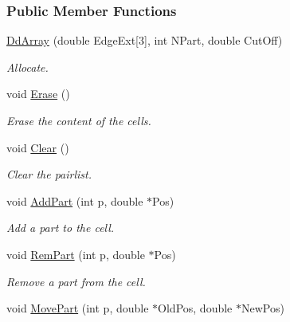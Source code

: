 \subsubsection*{\-Public \-Member \-Functions}
\begin{DoxyCompactItemize}
\item 
\hyperlink{classDdArray_a427b9066964de29a0ecd3d5fe2bedb56}{\-Dd\-Array} (double \-Edge\-Ext\mbox{[}3\mbox{]}, int \-N\-Part, double \-Cut\-Off)
\begin{DoxyCompactList}\small\item\em \-Allocate. \end{DoxyCompactList}\item 
void \hyperlink{classDdArray_a98ae2e78109ea826eea71da14c37ce95}{\-Erase} ()
\begin{DoxyCompactList}\small\item\em \-Erase the content of the cells. \end{DoxyCompactList}\item 
\hypertarget{classDdArray_aa71d36872f416feaa853788a7a7a7ef8}{void \hyperlink{classDdArray_aa71d36872f416feaa853788a7a7a7ef8}{\-Clear} ()}\label{classDdArray_aa71d36872f416feaa853788a7a7a7ef8}

\begin{DoxyCompactList}\small\item\em \-Clear the pairlist. \end{DoxyCompactList}\item 
\hypertarget{classDdArray_a16bd930c99f12ce47277234de23650ca}{void \hyperlink{classDdArray_a16bd930c99f12ce47277234de23650ca}{\-Add\-Part} (int p, double $\ast$\-Pos)}\label{classDdArray_a16bd930c99f12ce47277234de23650ca}

\begin{DoxyCompactList}\small\item\em \-Add a part to the cell. \end{DoxyCompactList}\item 
\hypertarget{classDdArray_aa81dd095eb9134882b33685338bec68c}{void \hyperlink{classDdArray_aa81dd095eb9134882b33685338bec68c}{\-Rem\-Part} (int p, double $\ast$\-Pos)}\label{classDdArray_aa81dd095eb9134882b33685338bec68c}

\begin{DoxyCompactList}\small\item\em \-Remove a part from the cell. \end{DoxyCompactList}\item 
\hypertarget{classDdArray_a02a69943ed15121906bda20d9c89cb37}{void \hyperlink{classDdArray_a02a69943ed15121906bda20d9c89cb37}{\-Move\-Part} (int p, double $\ast$\-Old\-Pos, double $\ast$\-New\-Pos)}\label{classDdArray_a02a69943ed15121906bda20d9c89cb37}


\end{DoxyCompactItemize}
